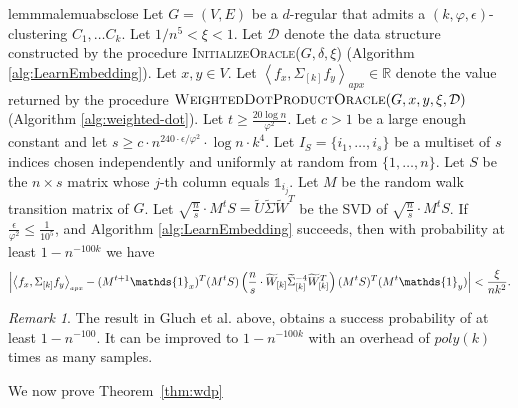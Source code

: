 \documentclass[letterpaper,11pt]{article}
\newcommand{\R}{\mathbb{R}}
\theoremstyle{plain}
\theoremstyle{definition}
\theoremstyle{remark}
\newtheorem{remark}[theorem]{Remark}
\newcommand{\adp}[1]
  {\ensuremath{\left\langle #1 \right\rangle_{\scriptscriptstyle apx}}}
\newcommand{\mycolor}[1]{\textcolor{black}{#1}}
\begin{document}
\begin{restatable}{lemmma}{lemuabsclose}\label{lem:u-abs-close}
	Let $G=(V,E)$ be a $d$-regular that admits a $(k,\varphi,\epsilon)$-clustering $C_1, \ldots C_k$. Let
	$1/n^5 < \xi < 1$. Let $\mathcal{D}$ denote the  data structure constructed by the procedure \textsc{InitializeOracle($G,\delta,\xi$)} (Algorithm \ref{alg:LearnEmbedding}). 
	Let $x,y\in V$. Let $\adp{f_x, \Sigma_{[k]}f_y}\in \R$ denote the value returned by the procedure $\textsc{WeightedDotProductOracle}(G,x,y,  \xi, \mathcal{D})$ (Algorithm \ref{alg:weighted-dot}).
	Let  $t\geq  \frac{20\log n}{\varphi^2}$. Let $c>1$ be a large enough constant and let 
	$s\geq c\cdot n^{240\cdot\epsilon / \varphi^2}\cdot \log n \cdot k^{4}$. Let 
	$I_S=\{i_1,\ldots, i_s\}$ be a multiset of $s$ indices chosen independently and uniformly at random from
	$\{1,\dots,n\}$. Let $S$ be the $n\times s$ matrix whose $j$-th column equals $\mathds{1}_{i_j}$. 
	Let $M$ be the random walk transition matrix of $G$. Let 
	$\sqrt{\frac{n}{s}} \cdot M^tS=\widetilde{U}\widetilde{\Sigma}\widetilde{W}^T$  be  the SVD of 
	$\sqrt{\frac{n}{s}} \cdot M^tS$. If $\frac{\epsilon}{\varphi^2}\leq \frac{1}{10^5}$, and Algorithm 
	\ref{alg:LearnEmbedding} succeeds,  then with probability at least $1-n^{-100k}$ we have
	\[\left|\adp{f_{x},\Sigma_{[k]} f_y} - (M^{t+1}\mathds{1}_{x})^T  (M^tS)\left(\frac{n}{s}\cdot\widetilde{W}_{[k]} \widetilde{\Sigma}^{-4}_{[k]} \widetilde{W}^T_{[k]}\right) (M^tS)^T (M^{t}\mathds{1}_{y}) \right|<
		\frac{\xi }{\mycolor{nk^2}} \text{.}
	\]
\end{restatable}


\begin{remark}
	The result in Gluch et al. above, obtains a success probability of at least $1 - n^{-100}$. It
	can be improved to $1 - n^{-100k}$ with an overhead of $poly(k)$ times as many samples.
\end{remark}

We now prove Theorem~\ref{thm:wdp}
\end{document}
